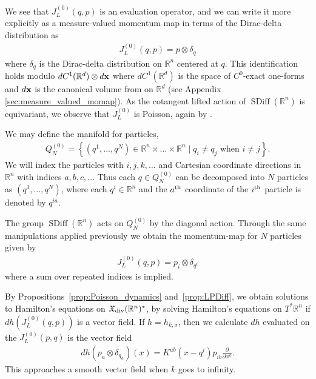 \documentclass[12pt]{amsart}
\newcommand{\pder}[2]{\ensuremath{\frac{\partial #1}{\partial #2}}}
\newcommand{\R}{\ensuremath{\mathbb{R}}}
\DeclareMathOperator{\SDiff}{SDiff}
\begin{document}
We see that $J_L^{(0)}(q,p)$ is an evaluation operator, and we can write it 
more explicitly as a measure-valued momentum map in terms of the Dirac-delta distribution as
\begin{align*}
  J_L^{(0)}( q , p ) = p \otimes \delta_q
\end{align*}
where $\delta_q$ is the Dirac-delta distribution on $\R^n$ centered at $q$.
This identification holds modulo $dC^1(\R^d) \otimes d{\bf x}$ where $dC^1(\R^d)$
is the space of $C^0$-exact one-forms and $d{\bf x}$ is the canonical volume from on $\R^d$
(see Appendix \ref{sec:measure_valued_momap}).
As the cotangent lifted action of $\SDiff(\R^n)$ is equivariant,
we observe that $J_L^{(0)}$ is Poisson, again by \cite[Thm~12.4.9]{MandS}.

We may define the manifold for particles,
\begin{align*}
  Q_N^{(0)} = \left\{ (q^1,\dots,q^N) \in \R^n \times \dots\times \R^n
                 \mid q_i \neq q_j \text{ when } i \neq j \right\}.
\end{align*}
We will index the particles with $i,j,k,\dots$ and Cartesian coordinate
directions in $\R^n$ with indices $a,b,c,\dots$
Thus each $q \in Q_N^{(0)}$ can be decomposed
into $N$ particles as $(q^1,\dots,q^N)$, where each $q^i \in \R^n$
and the $a^{\rm th}$ coordinate of the $i^{\rm th}$ particle
is denoted by $q^{ia}$.

The group $\SDiff(\R^n)$ acts on $Q_N^{(0)}$ by the diagonal action.
Through the same manipulations applied previously we obtain the
momentum-map for $N$ particles given by
\begin{align*}
  J_L^{(0)}(q,p) = p_i \otimes \delta_{q^i}
\end{align*}
where a sum over repeated indices is implied.

By Propositions~\ref{prop:Poisson_dynamics} and~\ref{prop:LPDiff},
we obtain solutions to Hamilton's equations
on $\mathfrak{X}_{\rm div}(\R^n)^*$, by solving
Hamilton's equations on $T^*\R^n$ if $dh( J_L^{(0)}(q,p) )$ is
a vector field.  If $h = h_{k,\sigma}$, then we calculate $dh$
evaluated on the $J_L^{(0)}(p,q)$ is the vector field
\begin{align*}
	dh( p_a \otimes \delta_{q_a} )  (x) = K^{ab}(x - q^i) p_{ib} \pder{}{x^a}.
\end{align*}
This approaches a smooth vector field when $k$ goes to infinity.
\end{document}
